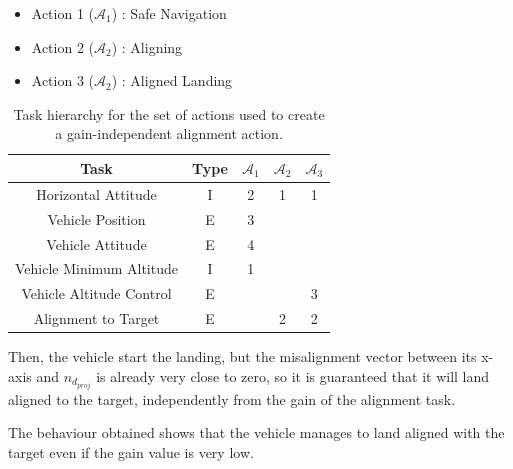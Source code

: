 \documentclass{article}
\begin{document}
\begin{table}[htb]
	\caption{Task hierarchy for the set of actions used to create a gain-independent alignment action.}
	\begin{itemize}
		\item Action 1 ($\mathcal{A}_{1}$) : Safe Navigation
		\item Action 2 ($\mathcal{A}_{2}$) : Aligning
		\item Action 3 ($\mathcal{A}_{2}$) : Aligned Landing
	\end{itemize}
	\label{tb_align3:actions_table}
	\begin{center}
		\footnotesize
		\begin{tabular}{ccccc}
			\toprule
			Task & Type & $\mathcal{A}_{1}$ & $\mathcal{A}_{2}$ & $\mathcal{A}_{3}$\\
			\midrule
			Horizontal Attitude             & I & 2 & 1 & 1 \\
			\hdashline
			Vehicle Position				& E & 3 &   &   \\
			\hdashline
			Vehicle Attitude                & E & 4 &   &   \\
			\hdashline
			Vehicle Minimum Altitude        & I & 1 &   &   \\
			\hdashline
			Vehicle Altitude Control        & E &   &   & 3 \\
			\hdashline
			Alignment to Target             & E &   & 2 & 2 \\
			
			\bottomrule
		\end{tabular}
	\end{center}
\end{table}%

Then, the vehicle start the landing, but the misalignment vector between its x-axis and \(n_{d_{proj}}\) is already very close to zero, so it is guaranteed that it will land aligned to the target, independently from the gain of the alignment task.
\begin{figure}[H]
	\centering
	\label{im:v_land_gain0_1_ind}
\end{figure} 
The behaviour obtained shows that the vehicle manages to land aligned with the target even if the gain value is very low.
 
\end{document}
